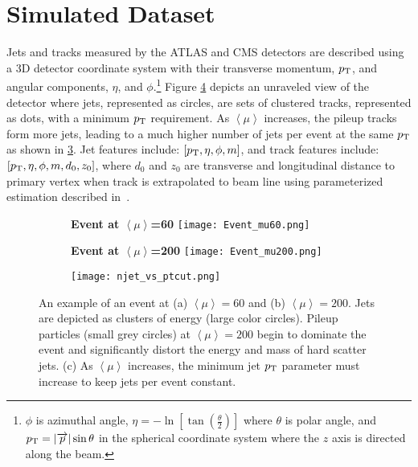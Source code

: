 \section{Simulated Dataset}\label{Dataset}\hfill

Jets and tracks measured by the ATLAS and CMS detectors are described using a 3D detector coordinate system with their transverse momentum, $p_{\rm T}$, and angular components, $\eta$, and $\phi$.\footnote{$\phi$ is azimuthal angle, $\eta=-\ln\left[ \tan\left( \frac{\theta}{2} \right) \right]$ where $\theta$ is polar angle, and $p_{\rm T}=|\overrightarrow{p}|\sin\theta$ in the spherical coordinate system where the $z$ axis is directed along the beam.}
Figure \ref{fig:HLLHC} depicts an unraveled view of the detector where jets, represented as circles, are sets of clustered tracks, represented as dots, with a minimum $p_{\rm T}$ requirement. As $\left\langle \mu \right\rangle$ increases, the pileup tracks form more jets, leading to a much higher number of jets per event at the same $p_{\rm T}$ as shown in \ref{fig:njets}. Jet features include: $[p_{\rm T},\eta,\phi,m]$, and track features include: $[p_{\rm T},\eta,\phi,m,d_0,z_0]$, where $d_0$ and $z_0$ are transverse and longitudinal distance to primary vertex when track is extrapolated to beam line using parameterized estimation described in~\cite{ATLAS:2021yvc}.

\begin{figure}[h]
\centering
\begin{subfigure}{.32\textwidth}
  \centering
  \textbf{\tiny{Event at $\left\langle \mu \right\rangle$=60}}
  \texttt{[image: Event\_mu60.png]}
  \caption{}
  \label{fig:sub1}
\end{subfigure}%
\begin{subfigure}{.32\textwidth}
  \centering
  \textbf{\tiny{Event at $\left\langle \mu \right\rangle$=200}}
  \texttt{[image: Event\_mu200.png]}
  \caption{}
  \label{fig:sub2}
\end{subfigure}
\begin{subfigure}{.32\textwidth}
  \texttt{[image: njet\_vs\_ptcut.png]} 
  \caption{}
  \label{fig:njets}
\end{subfigure}

\caption{An example of an event at (a) $\left\langle \mu \right\rangle=60$ and (b) $\left<\mu\right>=200$. Jets are depicted as clusters of energy (large color circles). Pileup particles (small grey circles) at $\left\langle \mu \right\rangle=200$ begin to dominate the event and significantly distort the energy and mass of hard scatter jets. (c) As $\left\langle \mu \right\rangle$ increases, the minimum jet $p_{\rm T}$ parameter must increase to keep jets per event constant. }
\label{fig:HLLHC}
\end{figure}

